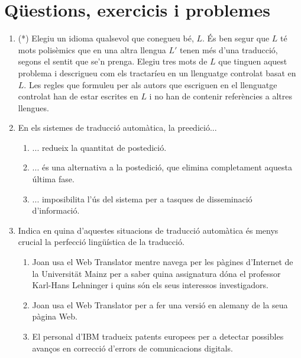 \section{Qüestions, exercicis i problemes}
\begin{enumerate}
\item(*) Elegiu un idioma qualsevol que conegueu bé, $L$. És ben segur
  que $L$ té mots polisèmics que en una altra llengua $L'$ tenen més d'una
  traducció, segons el sentit que se'n prenga. Elegiu tres mots de $L$
  que tinguen aquest problema i descrigueu com els tractaríeu en un
  llenguatge controlat basat en $L$. Les regles que formuleu per als
  autors que escriguen en el llenguatge controlat han de estar
  escrites en $L$ i no han de contenir referències a altres llengues.

\item En els sistemes de traducció automàtica, la
preedició...
 \begin{enumerate}
 \item ... redueix la quantitat de postedició.
 \item ... és una alternativa a la postedició, que elimina completament
 aquesta
 última fase.
 \item ... imposibilita l'ús del sistema per a tasques de
 disseminació d'informació.
 \end{enumerate}


\item Indica en quina d'aquestes situacions de traducció automàtica
      és menys crucial la perfecció lingüística
      de la traducció.
        \begin{enumerate}
        \item Joan usa el Web Translator mentre navega 
              per les
              pàgines d'Internet de la Universit\"{a}t Mainz 
              per a saber quina assignatura
              dóna el  professor
              Karl-Hans Lehninger i quins són els seus interessos
              investigadors.
        \item Joan usa el Web Translator per a fer una versió en
              alemany de la seua pàgina Web.
        \item El personal d'IBM tradueix patents europees
               per a
              detectar possibles avanços
              en correcció d'errors de comunicacions digitals.

        \end{enumerate}


\end{enumerate}
